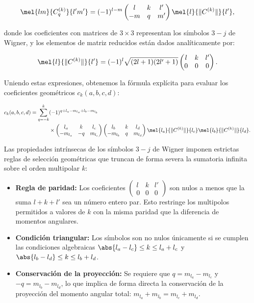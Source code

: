 \begin{equation}
  \mel{lm}{C_{q}^{(k)}}{l'm'} = (-1)^{l-m} \begin{pmatrix} l & k & l' \\ -m & q & m' \end{pmatrix} \mel{l}{\|C^{(k)}\|}{l'},
\end{equation}

donde los coeficientes con matrices de \( 3 \times 3 \) representan los símbolos \( 3-j \) de Wigner, y los elementos de matriz reducidos están dados analíticamente por:

\begin{equation}
  \mel{l}{\|C^{(k)}\|}{l'} = (-1)^l \sqrt{(2l+1)(2l'+1)} \begin{pmatrix} l & k & l' \\ 0 & 0 & 0 \end{pmatrix}.
\end{equation}

Uniendo estas expresiones, obtenemos la fórmula explícita para evaluar los coeficientes geométricos \( c_k(a,b,c,d) \):

\begin{align}
  c_k(a,b,c,d) = \sum_{q=-k}^k & (-1)^{q + l_a - m_{l_a} + l_b - m_{l_b}} \nonumber \\
  & \times \begin{pmatrix} l_a & k & l_c \\ -m_{l_a} & -q & m_{l_c} \end{pmatrix} \begin{pmatrix} l_b & k & l_d \\ -m_{l_b} & q & m_{l_d} \end{pmatrix} \mel{l_a}{\|C^{(k)}\|}{l_c}\mel{l_b}{\|C^{(k)}\|}{l_d}.
\end{align}

Las propiedades intrínsecas de los símbolos \( 3-j \) de Wigner imponen estrictas reglas de selección geométricas que truncan de forma severa la sumatoria infinita sobre el orden multipolar \( k \):

\begin{itemize}
\item \textbf{Regla de paridad:} Los coeficientes \( \begin{pmatrix} l & k & l' \\ 0 & 0 & 0 \end{pmatrix} \) son nulos a menos que la suma \( l + k + l' \) sea un número entero par. Esto restringe los multipolos permitidos a valores de \( k \) con la misma paridad que la diferencia de momentos angulares.
\item \textbf{Condición triangular:} Los símbolos son no nulos únicamente si se cumplen las condiciones algebraicas \( \abs{l_a - l_c} \le k \le l_a + l_c \) y \( \abs{l_b - l_d} \le k \le l_b + l_d \).
\item \textbf{Conservación de la proyección:} Se requiere que \( q = m_{l_a} - m_{l_c} \) y \( -q = m_{l_b} - m_{l_d} \), lo que implica de forma directa la conservación de la proyección del momento angular total: \( m_{l_a} + m_{l_b} = m_{l_c} + m_{l_d} \).
\end{itemize}
